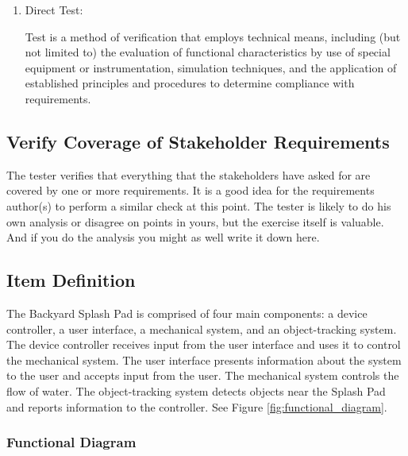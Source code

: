 \begin{slshape}
\begin{enumerate}
		\item Direct Test:

	Test is a method of verification that employs technical means, including (but not 
	limited to) the evaluation of functional characteristics by use of special equipment
	or instrumentation, simulation techniques, and the application of established 
	principles and procedures to determine compliance with requirements.
			
	\end{enumerate}		
	
\end{slshape}

\subsection{Verify Coverage of Stakeholder Requirements}

\begin{slshape}
\color{blue}
The tester verifies that everything that the stakeholders have asked for are covered by one or more requirements.  It is a good idea for the requirements author(s) to perform a similar check at this point.  The tester is likely to do his own analysis or disagree on points in yours, but the exercise itself is valuable. And if you do the analysis you might as well write it down here.   
\end{slshape}



\subsection{Item Definition} 
The Backyard Splash Pad is comprised of four main components: a device controller, a user interface, a mechanical system, and an object-tracking system. 
The device controller receives input from the user interface and uses it to control the mechanical system.
The user interface presents information about the system to the user and accepts input from the user.
The mechanical system controls the flow of water. 
The object-tracking system detects objects near the Splash Pad and reports information to the controller. 
See Figure \ref{fig:functional_diagram}.

\subsubsection{Functional Diagram}

